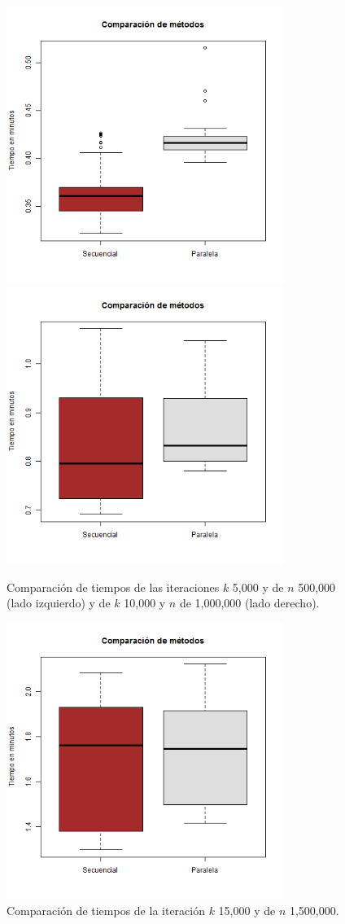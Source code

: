 \documentclass{article}
\begin{document}
\begin{figure}[H]
\includegraphics[width=9cm]{500000.png}       \includegraphics[width=9cm]{1000000.png}
\caption{Comparación de tiempos de las iteraciones $k$ 5,000 y de $n$ 500,000 (lado izquierdo) y de $k$ 10,000 y $n$ de 1,000,000 (lado derecho).}
\end{figure}
\begin{figure}[H]
\centering
\includegraphics[width=9cm]{1500000.png}      
\caption{Comparación de tiempos de la iteración $k$ 15,000 y de $n$ 1,500,000.}
\end{figure}
\end{document}
